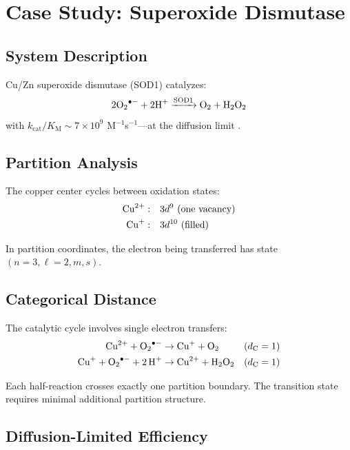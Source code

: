 \documentclass[twocolumn,10pt,a4paper]{article}
\theoremstyle{definition}
\theoremstyle{remark}
\newcommand{\kcat}{k_{\mathrm{cat}}}
\newcommand{\Km}{K_{\mathrm{M}}}
\newcommand{\dC}{d_{\mathrm{C}}}
\begin{document}
\section{Case Study: Superoxide Dismutase}
\label{sec:sod1}

\subsection{System Description}

Cu/Zn superoxide dismutase (SOD1) catalyzes:
\begin{equation}
    2 \ce{O2^{.-}} + 2 \ce{H+} \xrightarrow{\text{SOD1}} \ce{O2} + \ce{H2O2}
\end{equation}
with $\kcat/\Km \sim 7 \times 10^9$ M$^{-1}$s$^{-1}$---at the diffusion limit \citep{klug1972}.

\subsection{Partition Analysis}

The copper center cycles between oxidation states:
\begin{align}
    \ce{Cu^{2+}}: \quad & 3d^9 \text{ (one vacancy)} \\
    \ce{Cu^{+}}: \quad & 3d^{10} \text{ (filled)}
\end{align}

In partition coordinates, the electron being transferred has state $(n=3, \ell=2, m, s)$.

\subsection{Categorical Distance}

The catalytic cycle involves single electron transfers:
\begin{align}
    \ce{Cu^{2+} + O2^{.-}} &\to \ce{Cu^{+} + O2} && (\dC = 1) \\
    \ce{Cu^{+} + O2^{.-} + 2H+} &\to \ce{Cu^{2+} + H2O2} && (\dC = 1)
\end{align}

Each half-reaction crosses exactly one partition boundary. The transition state requires minimal additional partition structure.

\subsection{Diffusion-Limited Efficiency}
\end{document}
